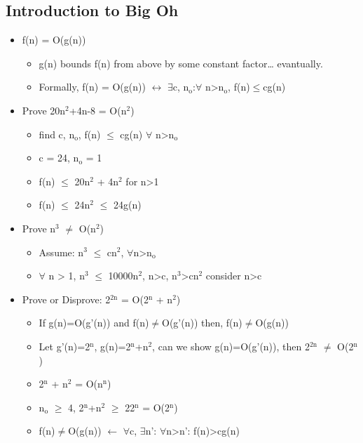 \documentclass[11pt]{article}
\begin{document}
\subsection*{Introduction to Big Oh}
\label{sec:org87e2215}
\begin{itemize}
\item f(n) = O(g(n))
\begin{itemize}
\item g(n) bounds f(n) from above by some constant factor\ldots{} evantually.
\item Formally, f(n) = O(g(n)) \(\leftrightarrow\) \(\exists\)c, n\(_{\text{o}}\):\(\forall\) n\textgreater{}n\(_{\text{o}}\), f(n)\(\le\)cg(n)
\end{itemize}
\item Prove 20n\(^{\text{2}}\)+4n-8 = O(n\(^{\text{2}}\))
\begin{itemize}
\item find c, n\(_{\text{o}}\), f(n) \(\le\) cg(n) \(\forall\) n>n\(_{\text{o}}\)
\item c = 24, n\(_{\text{o}}\) = 1
\item f(n) \(\le\) 20n\(^{\text{2}}\) + 4n\(^{\text{2}}\) for n>1
\item f(n) \(\le\) 24n\(^{\text{2}}\) \(\le\) 24g(n)
\end{itemize}
\item Prove n\(^{\text{3}}\) \(\ne\) O(n\(^{\text{2}}\))
\begin{itemize}
\item Assume: n\(^{\text{3}}\) \(\le\) cn\(^{\text{2}}\), \(\forall\)n>n\(_{\text{o}}\)
\item \(\forall\) n > 1, n\(^{\text{3}}\) \(\le\) 10000n\(^{\text{2}}\), n>c, n\(^{\text{3}}\)>cn\(^{\text{2}}\) consider n>c
\end{itemize}
\item Prove or Disprove: 2\(^{\text{2n}}\) = O(2\(^{\text{n}}\) + n\(^{\text{2}}\))
\begin{itemize}
\item If g(n)=O(g'(n)) and f(n)\(\ne\)O(g'(n)) then, f(n)\(\ne\)O(g(n))
\item Let g'(n)=2\(^{\text{n}}\), g(n)=2\(^{\text{n}}\)+n\(^{\text{2}}\), can we show g(n)=O(g'(n)), then 2\(^{\text{2n}}\) \(\ne\) O(2\(^{\text{n}}\))
\item 2\(^{\text{n}}\) + n\(^{\text{2}}\) = O(n\(^{\text{n}}\))
\item n\(_{\text{o}}\) \(\ge\) 4, 2\(^{\text{n}}\)+n\(^{\text{2}}\) \(\ge\) 22\(^{\text{n}}\) = O(2\(^{\text{n}}\))
\item f(n)\(\ne\)O(g(n)) \(\leftarrow\) \(\forall\)c, \(\exists\)n': \(\forall\)n>n': f(n)>cg(n)

\end{itemize}
\end{itemize}
\end{document}
